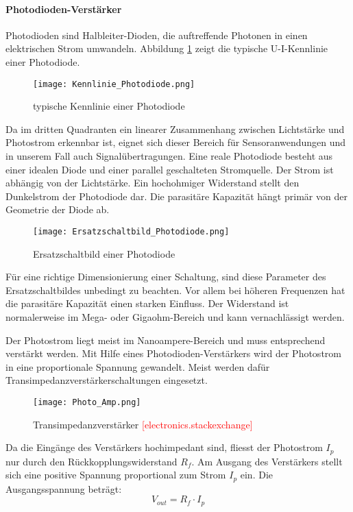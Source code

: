 \paragraph{Photodioden-Verstärker}
Photodioden sind Halbleiter-Dioden, die auftreffende Photonen in einen elektrischen Strom umwandeln. Abbildung \ref{fig:Kenn_Photodiode} zeigt die typische U-I-Kennlinie einer Photodiode.
\begin{figure}[h]
	\centering
	\texttt{[image: Kennlinie\_Photodiode.png]}
	\caption{typische Kennlinie einer Photodiode}\label{fig:Kenn_Photodiode}
\end{figure}
Da im dritten Quadranten ein linearer Zusammenhang zwischen Lichtstärke und Photostrom erkennbar ist, eignet sich dieser Bereich für Sensoranwendungen und in unserem Fall auch Signalübertragungen.
Eine reale Photodiode besteht aus einer idealen Diode und einer parallel geschalteten Stromquelle. Der Strom ist abhängig von der Lichtstärke. Ein hochohmiger Widerstand stellt den Dunkelstrom der Photodiode dar. Die parasitäre Kapazität hängt primär von der Geometrie der Diode ab.
 \begin{figure}[H]
 	\centering
 	\texttt{[image: Ersatzschaltbild\_Photodiode.png]}
 	\caption{Ersatzschaltbild einer Photodiode}\label{fig:Ersatz_Photodiode}
 \end{figure}
Für eine richtige Dimensionierung einer Schaltung, sind diese Parameter des Ersatzschaltbildes unbedingt zu beachten. Vor allem bei höheren Frequenzen hat die parasitäre Kapazität einen starken Einfluss. Der Widerstand ist normalerweise im Mega- oder Gigaohm-Bereich und kann vernachlässigt werden. \newline

Der Photostrom liegt meist im Nanoampere-Bereich und muss entsprechend verstärkt werden. Mit Hilfe eines Photodioden-Verstärkers wird der Photostrom in eine proportionale Spannung gewandelt. Meist werden dafür Transimpedanzverstärkerschaltungen eingesetzt.
\begin{figure}[h]
	\centering
	\texttt{[image: Photo\_Amp.png]}
	\caption{Transimpedanzverstärker \textcolor{red}{[electronics.stackexchange]}}\label{fig:Photo_Amp}
\end{figure}

Da die Eingänge des Verstärkers hochimpedant sind, fliesst der Photostrom $ I_{p} $ nur durch den Rückkopplungswiderstand $ R_{f} $. Am Ausgang des Verstärkers stellt sich eine positive Spannung proportional zum Strom $ I_{p} $ ein. Die Ausgangsspannung beträgt:
\begin{equation}\label{eq:Vout_Photo}
V_{out}=R_{f} \cdot I_{p}
\end{equation}

